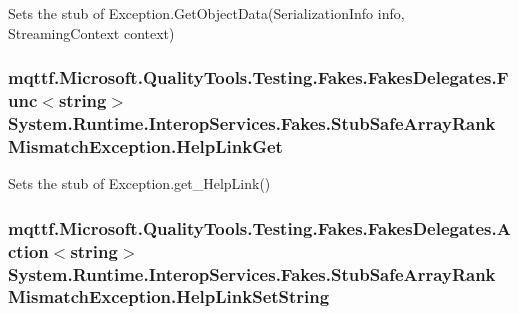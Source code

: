 Sets the stub of Exception.\-Get\-Object\-Data(\-Serialization\-Info info, Streaming\-Context context)

\hypertarget{class_system_1_1_runtime_1_1_interop_services_1_1_fakes_1_1_stub_safe_array_rank_mismatch_exception_a620d39c90cf8ff48857ae8b80c40ec97}{
\subsubsection[{Help\-Link\-Get}]{\setlength{\rightskip}{0pt plus 5cm}mqttf.\-Microsoft.\-Quality\-Tools.\-Testing.\-Fakes.\-Fakes\-Delegates.\-Func$<$string$>$ System.\-Runtime.\-Interop\-Services.\-Fakes.\-Stub\-Safe\-Array\-Rank\-Mismatch\-Exception.\-Help\-Link\-Get}}\label{class_system_1_1_runtime_1_1_interop_services_1_1_fakes_1_1_stub_safe_array_rank_mismatch_exception_a620d39c90cf8ff48857ae8b80c40ec97}


Sets the stub of Exception.\-get\-\_\-\-Help\-Link()

\hypertarget{class_system_1_1_runtime_1_1_interop_services_1_1_fakes_1_1_stub_safe_array_rank_mismatch_exception_afb19a2d9509de0cc167701cf1b397680}{
\subsubsection[{Help\-Link\-Set\-String}]{\setlength{\rightskip}{0pt plus 5cm}mqttf.\-Microsoft.\-Quality\-Tools.\-Testing.\-Fakes.\-Fakes\-Delegates.\-Action$<$string$>$ System.\-Runtime.\-Interop\-Services.\-Fakes.\-Stub\-Safe\-Array\-Rank\-Mismatch\-Exception.\-Help\-Link\-Set\-String}}\label{class_system_1_1_runtime_1_1_interop_services_1_1_fakes_1_1_stub_safe_array_rank_mismatch_exception_afb19a2d9509de0cc167701cf1b397680}


